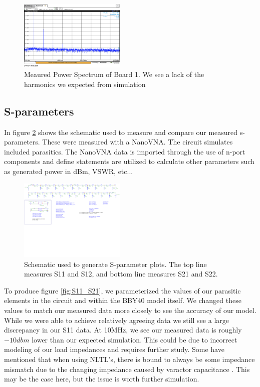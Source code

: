 \documentclass[journal]{IEEEtran} \usepackage[english]{babel}
\begin{document}
\begin{figure}[htb]
\centering
\includegraphics[width=0.45\textwidth]{MeasuredSpectrum.png}
\caption{Meaured Power Spectrum of Board 1. We see a lack of the harmonics we
expected from simulation}
\label{fig:MeasSpec}
\end{figure}





\subsection{S-parameters}


In figure \ref{fig:sparamSchem} shows the schematic used to measure and compare
our measured s-parameters. These were measured with a NanoVNA. The circuit simulates included parasitics. The NanoVNA data is imported through the use of n-port
components and define statements are utilized to calculate other parameters such
as generated power in dBm, VSWR, etc...


\begin{figure}[htb]
\centering
\includegraphics[width=0.45\textwidth,page = 1]{images/MostRecentSparamMeasSchem.pdf}
\caption{Schematic used to generate S-parameter plots. The top line measures S11 and S12, and bottom line measures S21 and S22. 
}\label{fig:sparamSchem}
\end{figure}


To produce figure \ref{fig:S11_S21}, we parameterized the values of our
parasitic elements in the circuit and within the BBY40 model itself. We changed
these values to match our measured data more closely to see the accuracy of our
model. While we were able to achieve relatively agreeing data we still see a
large discrepancy in our S11 data. At 10MHz, we see our measured data is
roughly $-10dbm$ lower than our expected simulation. This could be due to
incorrect modeling of our load impedances and requires further study. Some have
mentioned that when using NLTL's, there is bound to always be some impedance
mismatch due to the changing impedance caused by varactor capacitance
\cite{wilson1991pulse}. This may be the case here, but the issue is worth
further simulation.
\end{document}
